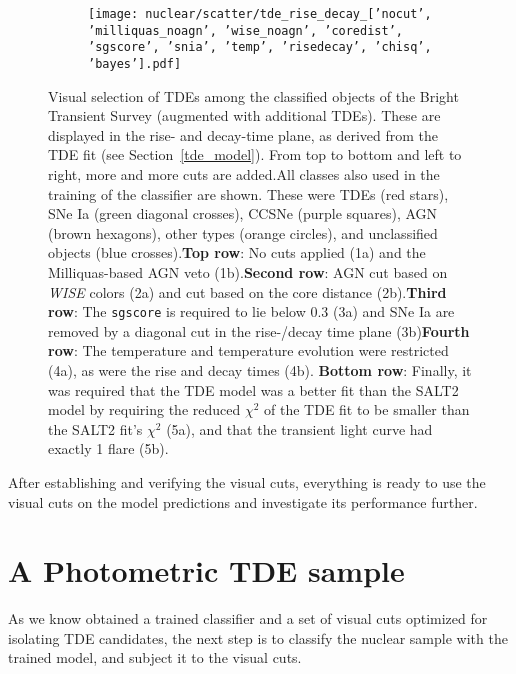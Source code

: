 \begin{figure}[htbp]
\begin{subfigure}[b]{0.49\textwidth}
  \end{subfigure}
  \begin{subfigure}[b]{0.49\textwidth}
    \centering
    \texttt{[image: nuclear/scatter/tde\_rise\_decay\_['nocut', 'milliquas\_noagn', 'wise\_noagn', 'coredist', 'sgscore', 'snia', 'temp', 'risedecay', 'chisq', 'bayes'].pdf]}
  \end{subfigure}
  \caption[BTS selection]{Visual selection of TDEs among the classified objects of the Bright Transient Survey (augmented with additional TDEs). These are displayed in the rise- and decay-time plane, as derived from the TDE fit (see Section~\ref{tde_model}). From top to bottom and left to right, more and more cuts are added.\newline \newline All classes also used in the training of the classifier are shown. These were TDEs (red stars), SNe Ia (green diagonal crosses), CCSNe (purple squares), AGN (brown hexagons), other types (orange circles), and unclassified objects (blue crosses).\newline \newline \textbf{Top row}: No cuts applied (1a) and the Milliquas-based AGN veto (1b).\newline \newline \textbf{Second row}: AGN cut based on \textit{WISE} colors (2a) and cut based on the core distance (2b).\newline \newline \textbf{Third row}: The \texttt{sgscore} is required to lie below 0.3 (3a) and SNe Ia are removed by a diagonal cut in the rise-/decay time plane (3b)\newline \newline \textbf{Fourth row}: The temperature and temperature evolution were restricted (4a), as were the rise and decay times (4b). \newline \newline \textbf{Bottom row}: Finally, it was required that the TDE model was a better fit than the SALT2 model by requiring the reduced $\chi^2$ of the TDE fit to be smaller than the SALT2 fit's $\chi^2$ (5a), and that the transient light curve had exactly 1 flare (5b).}
\end{figure}

After establishing and verifying the visual cuts, everything is ready to use the visual cuts on the model predictions and investigate its performance further.

\section{A Photometric TDE sample}
As we know obtained a trained classifier and a set of visual cuts optimized for isolating TDE candidates, the next step is to classify the nuclear sample with the trained model, and subject it to the visual cuts.

